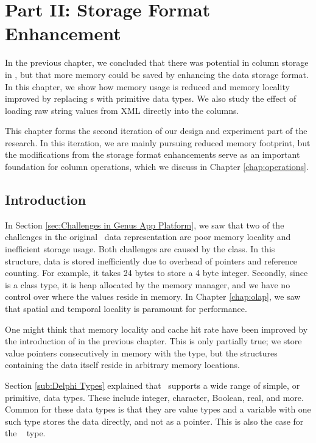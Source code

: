 \chapter{Part II: Storage Format Enhancement}
\label{chap:storage-format}
In the previous chapter, we concluded that there was potential in column storage in \gap, but that more memory could be saved by enhancing the data storage format. In this chapter, we show how memory usage is reduced and memory locality improved by replacing s with primitive data types. We also study the effect of loading raw string values from XML directly into the columns.

This chapter forms the second iteration of our design and experiment part of the research. In this iteration, we are mainly pursuing reduced memory footprint, but the modifications from the storage format enhancements serve as an important foundation for column operations, which we discuss in Chapter \ref{chap:operations}.  
\clearpage

\section{Introduction}
\label{sec:Introduction}
In Section \ref{sec:Challenges in Genus App Platform}, we saw that two of the challenges in the original \gap~data representation are poor memory locality and inefficient storage usage. Both challenges are caused by the  class. In this structure, data is stored inefficiently due to overhead of pointers and reference counting. For example, it takes 24 bytes to store a 4 byte integer. Secondly, since  is a class type, it is heap allocated by the memory manager, and we have no control over where the values reside in memory. In Chapter \ref{chap:olap}, we saw that spatial and temporal locality is paramount for performance.

One might think that memory locality and cache hit rate have been improved by the introduction of  in the previous chapter. This is only partially true; we store value pointers consecutively in memory with the  type, but the structures containing the data itself reside in arbitrary memory locations.

Section \ref{sub:Delphi Types} explained that \delphi~supports a wide range of simple, or primitive, data types. These include integer, character, Boolean, real, and more. Common for these data types is that they are value types and a variable with one such type stores the data directly, and not as a pointer. This is also the case for the \delphi~ type.

